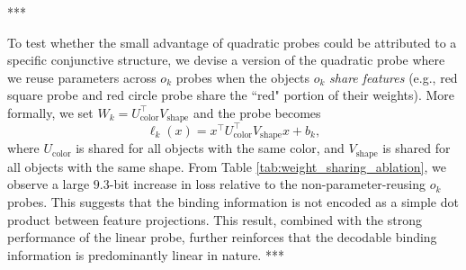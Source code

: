 \documentclass{article}
\theoremstyle{plain}
\theoremstyle{definition}
\theoremstyle{remark}
\begin{document}
\begin{table}[H]
\centering
\caption{\textbf{Average performance of object and feature code probes for different probe families when $z$ is the \texttt{[CLS]} token.} We report error reduction (ER) relative to the trivial majority-label baseline, which achieves $71.9\%$ accuracy for object codes and $75.0\%$ accuracy for feature codes.  Numbers in parentheses denote the number of parameters relative to the corresponding linear probe.}
\label{cls_probe}
\end{table}
***

To test whether the small advantage of quadratic probes could be attributed to a specific conjunctive structure, we devise a version of the quadratic probe where we reuse parameters across $o_k$ probes when the objects $o_k$ \textit{share features} (e.g., red square probe and red circle probe share the ``red" portion of their weights). More formally, we set $W_k=U_{\text{color}}^\top
V_{\text{shape}}$ and the probe becomes \[\ell_k(x)=x ^\top U_{\text{color}}^\top
V_{\text{shape}} x+b_k,\] where $U_{\text{color}}$ is shared for all objects with the same color, and $V_{\text{shape}}$ is shared for all objects with the same shape. From Table \ref{tab:weight_sharing_ablation}, we observe a large $9.3$-bit increase in loss relative to the non-parameter-reusing $o_k$ probes. This suggests that the binding information is not encoded as a simple dot product between feature projections. This result, combined with the strong performance of the linear probe, further reinforces that the decodable binding information is predominantly linear in nature.
***
\end{document}
